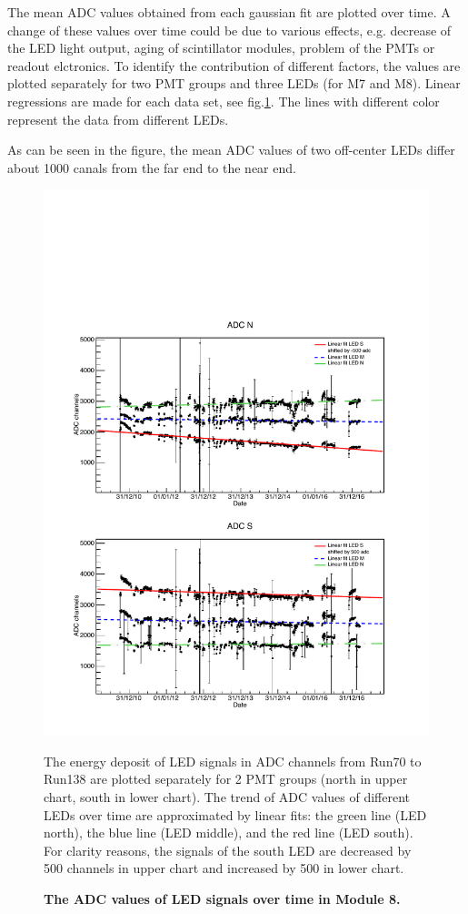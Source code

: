 The mean ADC values obtained from each gaussian fit are plotted over time. A change of these values over time could be due to various effects, e.g. decrease of the LED light output, aging of scintillator modules, problem of the PMTs or readout elctronics. To identify the contribution of different factors, the values are plotted separately for two PMT groups and three LEDs (for M7 and M8). Linear regressions are made for each data set, see fig.\ref{fig:M8LED}. The lines with different color represent the data from different LEDs.

As can be seen in the figure, the mean ADC values of two off-center LEDs differ about 1000 canals from the far end to the near end.





\begin{figure}[ht]
  \centering
  \includegraphics[width=0.9\textwidth{}]{./fig/M8LED.pdf}
  \caption{\textbf{The ADC values of LED signals over time in Module 8.}} The energy deposit of LED signals in ADC channels from Run70 to Run138 are plotted separately for 2 PMT groups (north in upper chart, south in lower chart). The trend of ADC values of different LEDs over time are approximated by linear fits: the green line (LED north), the blue line (LED middle), and the red line (LED south). For clarity reasons, the signals of the south LED are decreased by 500 channels in upper chart and increased by 500 in lower chart.
  \label{fig:M8LED}
\end{figure}
